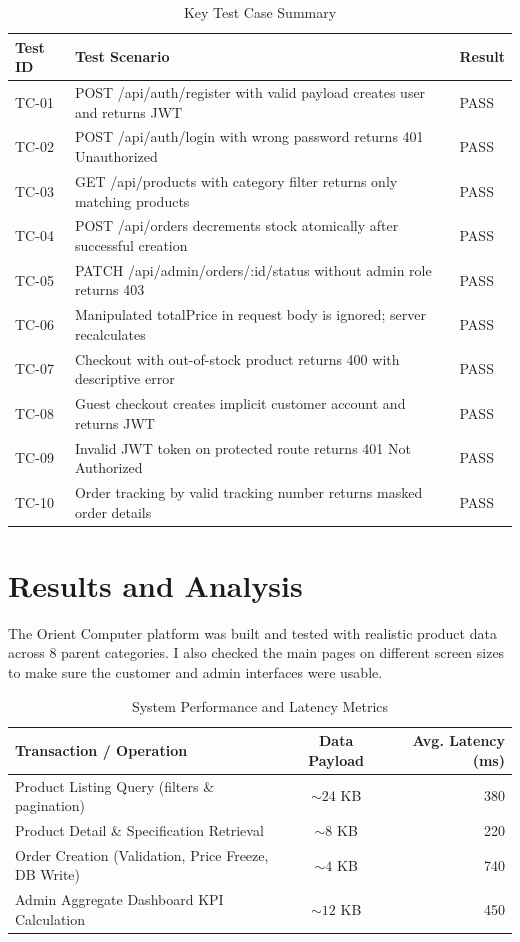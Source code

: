 \documentclass[12pt,a4paper,oneside]{report}
\begin{document}
\begin{table}[H]
\centering
\caption{Key Test Case Summary}
\label{tab:test_cases}
\begin{tabularx}{\textwidth}{lXl}
\toprule
\textbf{Test ID} & \textbf{Test Scenario} & \textbf{Result} \\
\midrule
TC-01 & POST /api/auth/register with valid payload creates user and returns JWT & PASS \\
TC-02 & POST /api/auth/login with wrong password returns 401 Unauthorized & PASS \\
TC-03 & GET /api/products with category filter returns only matching products & PASS \\
TC-04 & POST /api/orders decrements stock atomically after successful creation & PASS \\
TC-05 & PATCH /api/admin/orders/:id/status without admin role returns 403 & PASS \\
TC-06 & Manipulated totalPrice in request body is ignored; server recalculates & PASS \\
TC-07 & Checkout with out-of-stock product returns 400 with descriptive error & PASS \\
TC-08 & Guest checkout creates implicit customer account and returns JWT & PASS \\
TC-09 & Invalid JWT token on protected route returns 401 Not Authorized & PASS \\
TC-10 & Order tracking by valid tracking number returns masked order details & PASS \\
\bottomrule
\end{tabularx}
\end{table}

\chapter{Results and Analysis}

The Orient Computer platform was built and tested with realistic product data across 8 parent categories. I also checked the main pages on different screen sizes to make sure the customer and admin interfaces were usable.

\begin{table}[H]
\centering
\caption{System Performance and Latency Metrics}
\label{tab:latency_results}
\begin{tabularx}{\textwidth}{Xcr}
\toprule
\textbf{Transaction / Operation} & \textbf{Data Payload} & \textbf{Avg. Latency (ms)} \\
\midrule
Product Listing Query (filters \& pagination) & $\sim 24$ KB & 380 \\
Product Detail \& Specification Retrieval & $\sim 8$ KB & 220 \\
Order Creation (Validation, Price Freeze, DB Write) & $\sim 4$ KB & 740 \\
Admin Aggregate Dashboard KPI Calculation & $\sim 12$ KB & 450 \\
\bottomrule
\end{tabularx}
\end{table}
\end{document}

